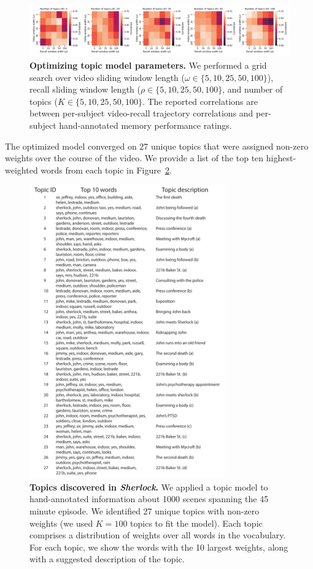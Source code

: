 \documentclass{article}
\begin{document}
\begin{figure}[p!]
\centering
\includegraphics[width=1\textwidth]{figs/parameter_search}
\caption{\small \textbf{Optimizing topic model parameters.}  We performed a grid search over video sliding window length ($\omega \in \{5, 10, 25, 50, 100 \}$), recall sliding window length ($\rho \in \{5, 10, 25, 50, 100 \}$, and number of topics ($K \in \{5, 10, 25, 50, 100 \}$.  The reported correlations are between per-subject video-recall trajectory correlations and per-subject hand-annotated memory performance ratings.}
\label{fig:paramsearch}
\end{figure}

The optimized model converged on 27 unique topics that were assigned non-zero weights over the course of the video.  We provide a list of the top ten highest-weighted words from each topic in Figure~\ref{fig:topics}.





\begin{figure}[p!]
\centering
\includegraphics[width=0.75\textwidth]{figs/topic_words}
\caption{\small \textbf{Topics discovered in \textit{Sherlock}.} We applied a topic model to hand-annotated information about 1000 scenes spanning the 45 minute episode.  We identified 27 unique topics with non-zero weights (we used $K=100$ topics to fit the model).  Each topic comprises a distribution of weights over all words in the vocabulary.  For each topic, we show the words with the 10 largest weights, along with a suggested description of the topic.}
\label{fig:topics}
\end{figure}
\end{document}
